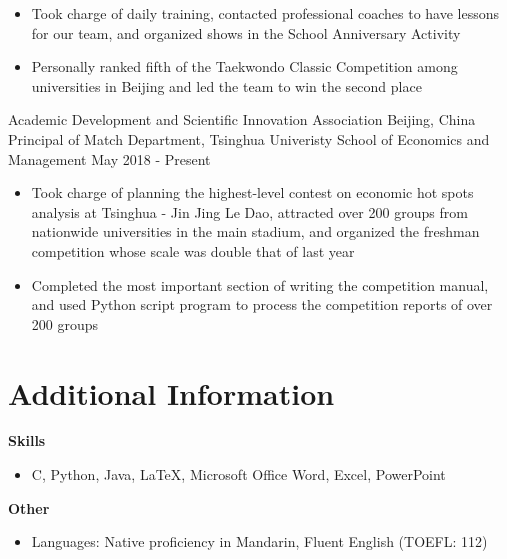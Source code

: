 \documentclass{resumeEN}
\begin{document}
    \begin{itemize}
        \item Took charge of daily training, contacted professional coaches to have lessons for our team, and organized shows in the School Anniversary Activity
        \item Personally ranked fifth of the Taekwondo Classic Competition among universities in Beijing and led the team to win the second place
    \end{itemize}


    \Experience
    {Academic Development and Scientific Innovation Association}
    {Beijing, China}
    {Principal of Match Department, Tsinghua Univeristy School of Economics and Management}
    {May 2018 - Present}

    \begin{itemize}
        \item Took charge of planning the highest-level contest on economic hot spots analysis at Tsinghua - Jin Jing Le Dao, attracted over 200 groups from nationwide universities in the main stadium, and organized the freshman competition whose scale was double that of last year
        \item Completed the most important section of writing the competition manual, and used Python script program to process the competition reports of over 200 groups
    \end{itemize}

    \section{Additional Information}
    \vspace{0.618ex}
    \textbf{Skills}
    \begin{itemize}
        \item C, Python, Java, {\LaTeX}, Microsoft Office Word, Excel, PowerPoint
    \end{itemize}
    \textbf{Other}
    \begin{itemize}
        \item Languages: Native proficiency in Mandarin, Fluent English (TOEFL: 112)
    \end{itemize}
\end{document}
